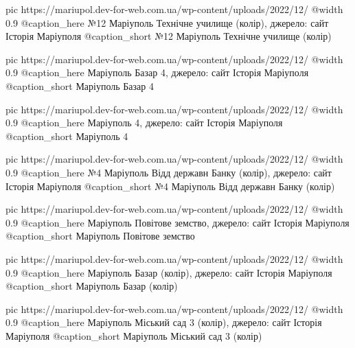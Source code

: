 	pic https://mariupol.dev-for-web.com.ua/wp-content/uploads/2022/12/%
	@width 0.9
	@caption_here №12 Маріуполь Технічне училище (колір), джерело: сайт Історія Маріуполя
	@caption_short №12 Маріуполь Технічне училище (колір)

	pic https://mariupol.dev-for-web.com.ua/wp-content/uploads/2022/12/%
	@width 0.9
	@caption_here Маріуполь Базар 4, джерело: сайт Історія Маріуполя
	@caption_short Маріуполь Базар 4

	pic https://mariupol.dev-for-web.com.ua/wp-content/uploads/2022/12/%
	@width 0.9
	@caption_here Маріуполь 4, джерело: сайт Історія Маріуполя
	@caption_short Маріуполь 4

	pic https://mariupol.dev-for-web.com.ua/wp-content/uploads/2022/12/%
	@width 0.9
	@caption_here №4 Маріуполь Відд державн Банку (колір), джерело: сайт Історія Маріуполя
	@caption_short №4 Маріуполь Відд державн Банку (колір)

	pic https://mariupol.dev-for-web.com.ua/wp-content/uploads/2022/12/%
	@width 0.9
	@caption_here Маріуполь Повітове земство, джерело: сайт Історія Маріуполя
	@caption_short Маріуполь Повітове земство

	pic https://mariupol.dev-for-web.com.ua/wp-content/uploads/2022/12/%
	@width 0.9
	@caption_here Маріуполь Базар (колір), джерело: сайт Історія Маріуполя
	@caption_short Маріуполь Базар (колір)

	pic https://mariupol.dev-for-web.com.ua/wp-content/uploads/2022/12/%
	@width 0.9
	@caption_here Маріуполь Міський сад 3 (колір), джерело: сайт Історія Маріуполя
	@caption_short Маріуполь Міський сад 3 (колір)


